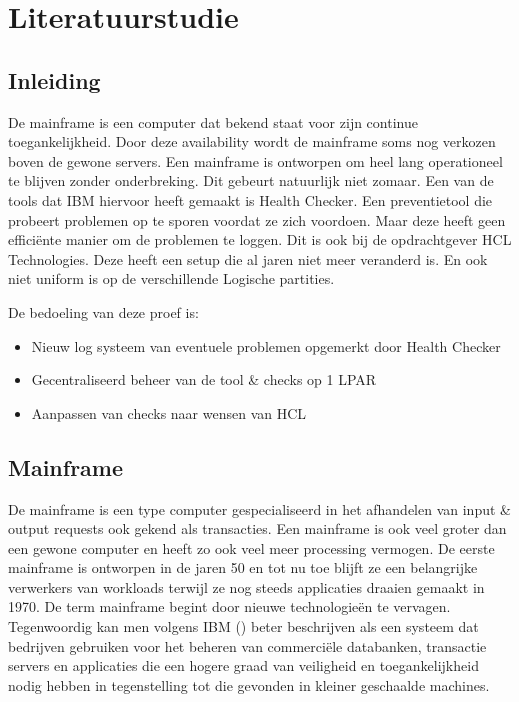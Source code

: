\section{Literatuurstudie}
\label{sec:Literatuurstudie}

\subsection{Inleiding}
\label{subsec:Inleiding}

De mainframe is een computer dat bekend staat voor zijn continue toegankelijkheid. Door deze availability wordt de mainframe soms nog verkozen boven de gewone servers. Een mainframe is ontworpen om heel lang operationeel te blijven zonder onderbreking. Dit gebeurt natuurlijk niet zomaar. Een van de tools dat IBM hiervoor heeft gemaakt is Health Checker.  Een preventietool die probeert problemen op te sporen voordat ze zich voordoen. Maar deze heeft geen efficiënte manier om de problemen te loggen. Dit is ook bij de opdrachtgever HCL Technologies. Deze heeft een setup die al jaren niet meer veranderd is. En ook niet uniform is op de verschillende Logische partities. 

De bedoeling van deze proef is: 

\begin{itemize}
	\item Nieuw log systeem van eventuele problemen opgemerkt door Health Checker 
	\item Gecentraliseerd beheer van de tool \& checks op 1 LPAR 
	\item Aanpassen van checks naar wensen van HCL 
\end{itemize}

\subsection{Mainframe}
\label{subsec:Mainframe}

De mainframe is een type computer gespecialiseerd in het afhandelen van input \& output requests ook gekend als transacties. Een mainframe is ook veel groter dan een gewone computer en heeft zo ook veel meer processing vermogen. De eerste mainframe is ontworpen in de jaren 50 en tot nu toe blijft ze een belangrijke verwerkers van workloads terwijl ze nog steeds applicaties draaien gemaakt in 1970. De term mainframe begint door nieuwe technologieën te vervagen. Tegenwoordig kan men volgens IBM (\cite{Ebbers2011}) beter beschrijven als een systeem dat bedrijven gebruiken voor het beheren van commerciële databanken, transactie servers en applicaties die een hogere graad van veiligheid en toegankelijkheid nodig hebben in tegenstelling tot die gevonden in kleiner geschaalde machines.  


